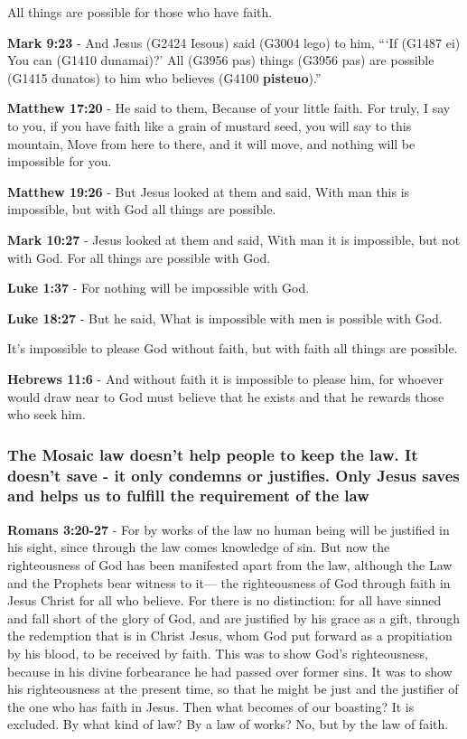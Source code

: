 \documentclass[11pt]{article}
\begin{document}
All things are possible for those who have faith.

\textbf{Mark 9:23} - And Jesus (G2424 Iesous) said (G3004 lego) to him, “‘If (G1487 ei) You can (G1410 dunamai)?’ All (G3956 pas) things (G3956 pas) are possible (G1415 dunatos) to him who believes (G4100 \textbf{pisteuo}).”

\textbf{Matthew 17:20} - He said to them, Because of your little faith. For truly, I say to you, if you have faith like a grain of mustard seed, you will say to this mountain, Move from here to there, and it will move, and nothing will be impossible for you.

\textbf{Matthew 19:26} - But Jesus looked at them and said, With man this is impossible, but with God all things are possible.

\textbf{Mark 10:27} - Jesus looked at them and said, With man it is impossible, but not with God. For all things are possible with God.

\textbf{Luke 1:37} - For nothing will be impossible with God.

\textbf{Luke 18:27} - But he said, What is impossible with men is possible with God.

It's impossible to please God without faith, but with faith all things are possible.

\textbf{Hebrews 11:6} - And without faith it is impossible to please him, for whoever would draw near to God must believe that he exists and that he rewards those who seek him.

\subsubsection{The Mosaic law doesn't help people to keep the law. It doesn't save - it only condemns or justifies. Only Jesus saves and helps us to fulfill the requirement of the law}
\label{sec:org444f726}
\textbf{Romans 3:20-27} - For by works of the law no human being will be justified in his sight, since through the law comes knowledge of sin. But now the righteousness of God has been manifested apart from the law, although the Law and the Prophets bear witness to it— the righteousness of God through faith in Jesus Christ for all who believe. For there is no distinction: for all have sinned and fall short of the glory of God, and are justified by his grace as a gift, through the redemption that is in Christ Jesus, whom God put forward as a propitiation by his blood, to be received by faith. This was to show God's righteousness, because in his divine forbearance he had passed over former sins. It was to show his righteousness at the present time, so that he might be just and the justifier of the one who has faith in Jesus. Then what becomes of our boasting? It is excluded. By what kind of law? By a law of works? No, but by the law of faith.
\end{document}
